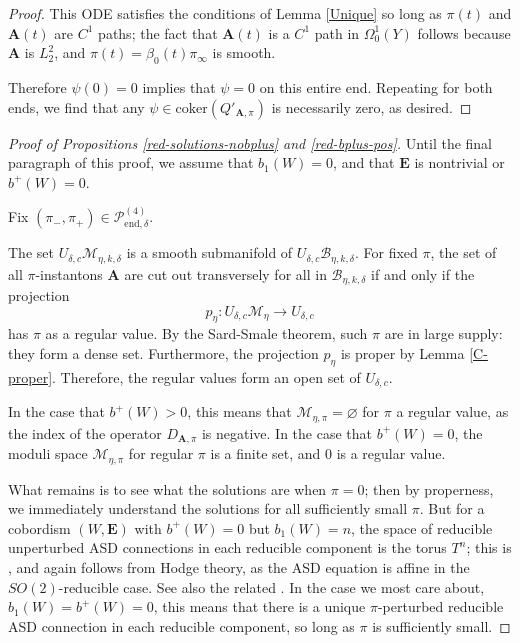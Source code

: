 \documentclass[10pt,a4paper]{amsart}
\theoremstyle{definition}
\theoremstyle{remark}
\numberwithin{figure}{qchap}
\begin{document}
\begin{proof}
This ODE satisfies the conditions of Lemma \ref{Unique} so long as $\pi(t)$ and $\mathbf{A}(t)$ are $C^1$ paths; the fact that $\mathbf{A}(t)$ is a $C^1$ path in $\Omega^1_0(Y)$ follows because $\mathbf{A}$ is $L^2_2$, and $\pi(t) = \beta_0(t) \pi_\infty$ is smooth.

Therefore $\psi(0) = 0$ implies that $\psi = 0$ on this entire end. Repeating for both ends, we find that any $\psi \in \text{coker}(Q'_{\mathbf{A},\pi})$ is necessarily zero, as desired.
\end{proof}

\begin{proof}[Proof of Propositions \ref{red-solutions-nobplus} and \ref{red-bplus-pos}]
Until the final paragraph of this proof, we assume that $b_1(W) = 0$, and that $\mathbf{E}$ is nontrivial or $b^+(W) = 0$.

Fix $(\pi_-, \pi_+) \in \mathcal P^{(4)}_{\text{end}, \delta}$.

The set $U_{\delta,c} \mathcal M_{\eta,k,\delta}$ is a smooth submanifold of $U_{\delta,c} \mathcal B_{\eta, k, \delta}$. For fixed $\pi$, the set of all $\pi$-instantons $\mathbf{A}$ are cut out transversely for all in $\mathcal B_{\eta, k, \delta}$ if and only if the projection
$$p_\eta: U_{\delta,c} \mathcal M_{\eta} \to U_{\delta,c}$$
has $\pi$ as a regular value. By the Sard-Smale theorem, such $\pi$ are in large supply: they form a dense set. Furthermore, the projection $p_\eta$ is proper by Lemma \ref{C-proper}. Therefore, the regular values form an open set of $U_{\delta,c}$.

In the case that $b^+(W) > 0$, this means that $\mathcal M_{\eta, \pi} = \varnothing$ for $\pi$ a regular value, as the index of the operator $D_{\mathbf{A},\pi}$ is negative. In the case that  $b^+(W) = 0$, the moduli space $\mathcal M_{\eta, \pi}$ for regular $\pi$ is a finite set, and $0$ is a regular value.

What remains is to see what the solutions are when $\pi = 0$; then by properness, we immediately understand the solutions for all sufficiently small $\pi$. But for a cobordism $(W,\mathbf{E})$ with $b^+(W) = 0$ but $b_1(W) = n$, the space of reducible unperturbed ASD connections in each reducible component is the torus $T^n$; this is \cite[Lemma~1.6]{Dae}, and again follows from Hodge theory, as the ASD equation is affine in the $SO(2)$-reducible case. See also the related \cite[Lemma~2]{Fr1}. In the case we most care about, $b_1(W) = b^+(W) = 0$, this means that there is a unique $\pi$-perturbed reducible ASD connection in each reducible component, so long as $\pi$ is sufficiently small.


\end{proof}
\end{document}
